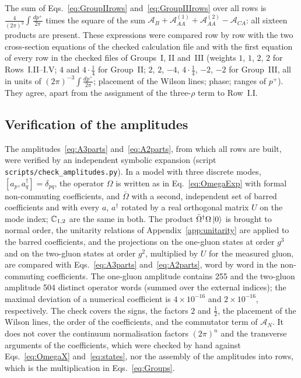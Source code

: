 The sum of Eqs.~\eqref{eq:GroupIIrows} and~\eqref{eq:GroupIIIrows} over all rows is $\frac{4}{(2\pi)^3}\int\frac{dp^+}{2\pi}$ times the square of the sum $\mathcal A_B+\mathcal A^{(1)}_{AA}+\mathcal A^{(2)}_{AA}-\mathcal A_{CA}$: all sixteen products are present. These expressions were compared row by row with the two cross-section equations of the checked calculation file and with the first equation of every row in the checked files of Groups~I, II and~III (weights $1$, $1$, $2$, $2$ for Rows~I.II--I.V; $4$ and $4\cdot\frac14$ for Group~II; $2$, $2$, $-4$, $4\cdot\frac14$, $-2$, $-2$ for Group~III, all in units of $(2\pi)^{-3}\int\frac{dp^+}{2\pi}$; placement of the Wilson lines; phase; ranges of $p^+$). They agree, apart from the assignment of the three-$\rho$ term to Row~I.I.

\subsection{Verification of the amplitudes}\label{app:rows_check}

The amplitudes~\eqref{eq:A3parts} and~\eqref{eq:A2parts}, from which all rows are built, were verified by an independent symbolic expansion (script \texttt{scripts/check\_amplitudes.py}). In a model with three discrete modes, $[a_p,a^\dagger_q]=\delta_{pq}$, the operator $\Omega$ is written as in Eq.~\eqref{eq:OmegaExp} with formal non-commuting coefficients, and $\bar\Omega$ with a second, independent set of barred coefficients and with every $a$, $a^\dagger$ rotated by a real orthogonal matrix $U$ on the mode index; $\mathbb{C}_{1,2}$ are the same in both. The product $\bar\Omega^\dagger\Omega\ket0$ is brought to normal order, the unitarity relations of Appendix~\ref{app:unitarity} are applied to the barred coefficients, and the projections on the one-gluon states at order $g^3$ and on the two-gluon states at order $g^2$, multiplied by $U$ for the measured gluon, are compared with Eqs.~\eqref{eq:A3parts} and~\eqref{eq:A2parts}, word by word in the non-commuting coefficients. The one-gluon amplitude contains 255 and the two-gluon amplitude 504 distinct operator words (summed over the external indices); the maximal deviation of a numerical coefficient is $4\times10^{-16}$ and $2\times10^{-16}$, respectively. The check covers the signs, the factors $2$ and $\frac12$, the placement of the Wilson lines, the order of the coefficients, and the commutator term of $\mathcal A_N$. It does not cover the continuum normalisation factors $(2\pi)^n$ and the transverse arguments of the coefficients, which were checked by hand against Eqs.~\eqref{eq:OmegaX} and~\eqref{eq:states}, nor the assembly of the amplitudes into rows, which is the multiplication in Eqs.~\eqref{eq:Groups}.
